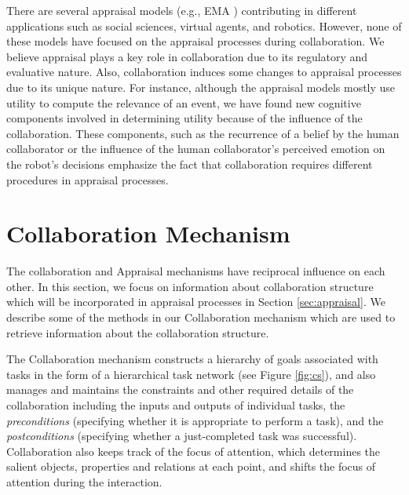 \documentclass[12pt]{report}
\begin{document}
There are several appraisal models (e.g., EMA \cite{marsella:ema-process-model})
contributing in different applications such as social sciences, virtual agents,
and robotics. However, none of these models have focused on the appraisal
processes during collaboration. We believe appraisal plays a key role in
collaboration due to its regulatory and evaluative nature. Also, collaboration
induces some changes to appraisal processes due to its unique nature. For
instance, although the appraisal models mostly use utility to compute the
relevance of an event, we have found new cognitive components involved in
determining utility because of the influence of the collaboration. These
components, such as the recurrence of a belief by the human collaborator or the
influence of the human collaborator's perceived emotion on the robot's decisions
emphasize the fact that collaboration requires different procedures in appraisal
processes.

\vspace*{-5mm}
\section{Collaboration Mechanism}
\vspace*{-4mm}
The collaboration and Appraisal mechanisms have reciprocal influence on each
other. In this section, we focus on information about collaboration structure
which will be incorporated in appraisal processes in Section
\ref{sec:appraisal}. We describe some of the methods in our Collaboration
mechanism which are used to retrieve information about the collaboration
structure.

The Collaboration mechanism constructs a hierarchy of goals associated with
tasks in the form of a hierarchical task network (see Figure \ref{fig:cs}), and
also manages and maintains the constraints and other required details of the
collaboration including the inputs and outputs of individual tasks, the
\textit{preconditions} (specifying whether it is appropriate to perform a task),
and the \textit{postconditions} (specifying whether a just-completed task was
successful). Collaboration also keeps track of the focus of attention, which
determines the salient objects, properties and relations at each point, and
shifts the focus of attention during the interaction.
\end{document}
